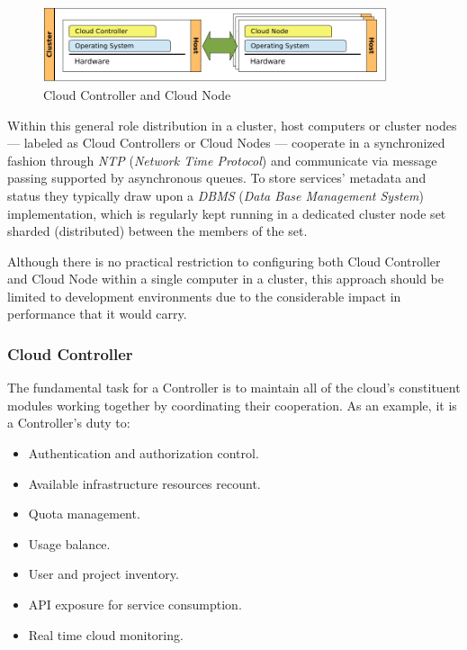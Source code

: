 \begin{figure}[tbp]
\begin{center}
\includegraphics[width=0.9\textwidth]{imagenes/004.pdf}
 \caption{Cloud Controller and Cloud Node}
\label{fig:archcloud}
\end{center}
\end{figure}

Within this general role distribution in a cluster, host computers or cluster nodes --- labeled as Cloud Controllers or Cloud Nodes --- cooperate in a synchronized fashion through \emph{NTP} (\emph{Network Time Protocol}) and communicate via message passing supported by asynchronous queues. To store services' metadata and status they typically draw upon a \emph{DBMS} (\emph{Data Base Management System}) implementation, which is regularly kept running in a dedicated cluster node set sharded (distributed) between the members of the set.

Although there is no practical restriction to configuring both Cloud Controller and Cloud Node within a single computer in a cluster, this approach should be limited to development environments due to the considerable impact in performance that it would carry.


\subsubsection{Cloud Controller}\label{subsubsec:cloudcontroller}

\noindent The fundamental task for a Controller is to maintain all of the cloud's constituent modules working together by coordinating their cooperation. As an example, it is a Controller's duty to:

\begin{itemize}
 \item Authentication and authorization control.
 \item Available infrastructure resources recount.
 \item Quota management.
 \item Usage balance.
 \item User and project inventory.
 \item API exposure for service consumption.
 \item Real time cloud monitoring.
\end{itemize}


